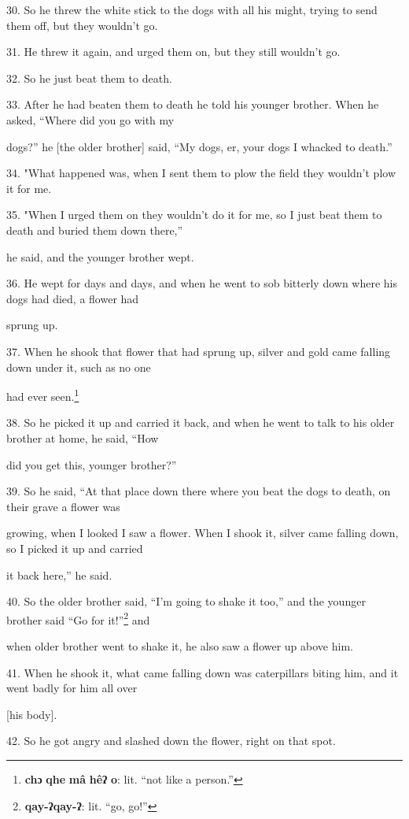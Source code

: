 30. So he threw the white stick to the dogs with all his might, trying to send
them off, but they wouldn't go.

31. He threw it again, and urged them on, but they still wouldn't go.

32. So he just beat them to death.

33. After he had beaten them to death he told his younger brother. When he asked,
``Where did you go with my

dogs?'' he [the older brother] said, ``My dogs, er, your dogs I whacked to death.''

34. "What happened was, when I sent them to plow the field they wouldn't
plow it for me.

35. "When I urged them on they wouldn't do it for me, so I just beat them
to death and buried them down there,''

he said, and the younger brother wept.

36. He wept for days and days, and when he went to sob bitterly down where his
dogs had died, a flower had

sprung up.

37. When he shook that flower that had sprung up, silver and gold came falling
down under it, such as no one

had ever seen.\footnote{\textbf{chɔ} \textbf{qhe} \textbf{mâ} \textbf{hêʔ} \textbf{o}: lit. ``not like a person.''}

38. So he picked it up and carried it back, and when he went to talk to his older
brother at home, he said, ``How

did you get this, younger brother?''

39. So he said, ``At that place down there where you beat the dogs to death, on
their grave a flower was

growing, when I looked I saw a flower. When I shook it, silver came falling down,
so I picked it up and carried

it back here,'' he said.

40. So the older brother said, ``I'm going to shake it too,'' and the younger brother
said ``Go for it!''\footnote{\textbf{qay-ʔqay-ʔ}: lit. ``go, go!''} and

when older brother went to shake it, he also saw a flower up above him.

41. When he shook it, what came falling down was caterpillars biting him, and it
went badly for him all over

[his body].

42. So he got angry and slashed down the flower, right on that spot.

